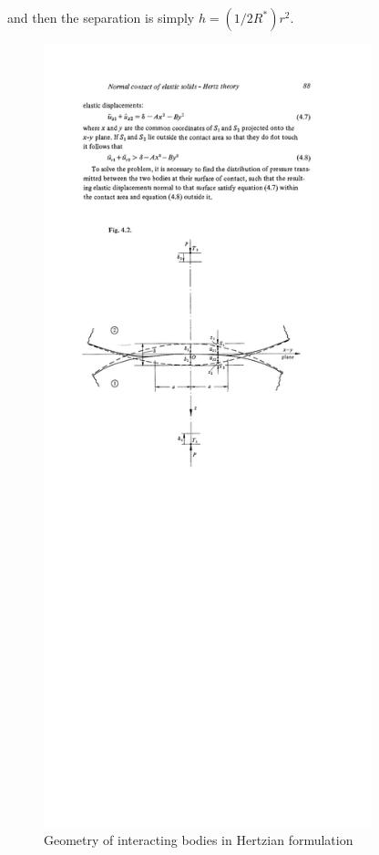 and then the separation is simply $h = (1/2R^*)r^2$.

\begin{figure}[ht!]
	\centering
	\includegraphics[width=0.85\textwidth]{chapters/figures/hertzGeometry}
	\caption{Geometry of interacting bodies in Hertzian formulation}
	\label{fig:hertzgeometry}
\end{figure}

